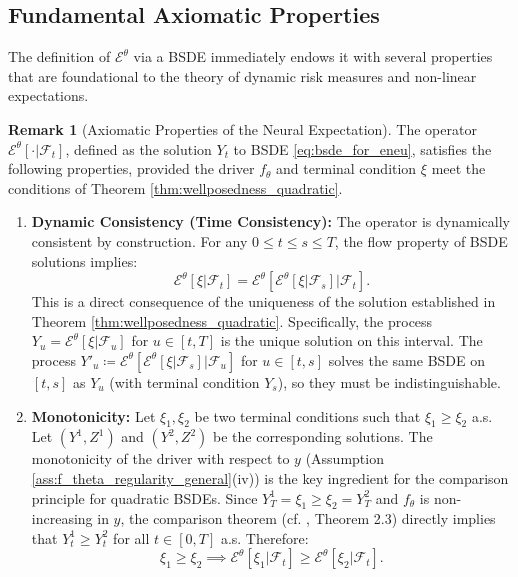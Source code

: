 \documentclass[qian]{imsart}
\newcommand{\Fcal}{\mathcal{F}}
\newcommand{\cEneutheta}{\mathcal{E}^{\theta}}
\theoremstyle{plain}
\theoremstyle{definition}
\newtheorem{remark}[theorem]{Remark}
\begin{document}
\subsection{Fundamental Axiomatic Properties}

The definition of $\cEneutheta$ via a BSDE immediately endows it with several properties that are foundational to the theory of dynamic risk measures and non-linear expectations.

\begin{remark}[Axiomatic Properties of the Neural Expectation]
\label{rem:axiomatic_properties_revised}
The operator $\cEneutheta[\cdot|\Fcal_t]$, defined as the solution $Y_t$ to BSDE \eqref{eq:bsde_for_eneu}, satisfies the following properties, provided the driver $f_\theta$ and terminal condition $\xi$ meet the conditions of Theorem \ref{thm:wellposedness_quadratic}.

\begin{enumerate}[label=(\roman*), leftmargin=*]
    \item \textbf{Dynamic Consistency (Time Consistency):} The operator is dynamically consistent by construction. For any $0 \le t \le s \le T$, the flow property of BSDE solutions implies:
    \[ \cEneutheta[\xi | \Fcal_t] = \cEneutheta\left[ \cEneutheta[\xi | \Fcal_s] \big| \Fcal_t \right]. \]
    This is a direct consequence of the uniqueness of the solution established in Theorem \ref{thm:wellposedness_quadratic}. Specifically, the process $Y_u = \cEneutheta[\xi|\Fcal_u]$ for $u \in [t,T]$ is the unique solution on this interval. The process $Y'_u \coloneqq \cEneutheta\left[ \cEneutheta[\xi | \Fcal_s] \big| \Fcal_u \right]$ for $u \in [t,s]$ solves the same BSDE on $[t,s]$ as $Y_u$ (with terminal condition $Y_s$), so they must be indistinguishable.

    \item \textbf{Monotonicity:} Let $\xi_1, \xi_2$ be two terminal conditions such that $\xi_1 \ge \xi_2$ a.s. Let $(Y^1,Z^1)$ and $(Y^2,Z^2)$ be the corresponding solutions. The monotonicity of the driver with respect to $y$ (Assumption \ref{ass:f_theta_regularity_general}(iv)) is the key ingredient for the comparison principle for quadratic BSDEs. Since $Y^1_T = \xi_1 \ge \xi_2 = Y^2_T$ and $f_\theta$ is non-increasing in $y$, the comparison theorem (cf. \cite{Kobylanski2000}, Theorem 2.3) directly implies that $Y^1_t \ge Y^2_t$ for all $t \in [0,T]$ a.s. Therefore:
    \[ \xi_1 \ge \xi_2 \implies \cEneutheta[\xi_1 | \Fcal_t] \ge \cEneutheta[\xi_2 | \Fcal_t]. \]


\end{enumerate}
\end{remark}
\end{document}
